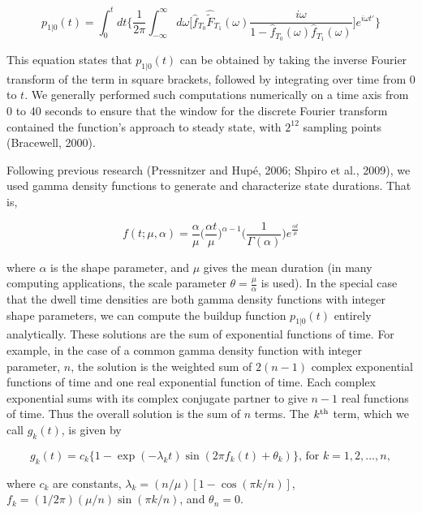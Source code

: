 \begin{equation}
p_{1|0}(t)=\int_{0}^{t}dt\bigg\{\frac{1}{2\pi}\int_{-\infty}^{\infty}d\omega\Bigg[\hat{f}_{T_0}\hat{\tilde{F}}_{T_1}(\omega)\frac{i\omega}{1-\hat{f}_{T_0}(\omega)\hat{f}_{T_1}(\omega)}\Bigg]e^{i\omega t'}\bigg\}
\label{eqn:p10tInt}
\end{equation}

This equation states that $p_{1|0}(t)$ can be obtained by taking the inverse Fourier transform of the term in square brackets, followed by integrating over time from 0 to $t$. We generally performed such computations numerically on a time axis from 0 to 40 seconds to ensure that the window for the discrete Fourier transform contained the function's approach to steady state, with $2^{12}$ sampling points (Bracewell, 2000). 

Following previous research (Pressnitzer and Hupé, 2006; Shpiro et al., 2009), we used gamma density functions to generate and characterize state durations. That is, 

\begin{equation}
f(t; \mu,\alpha) = \frac{\alpha}{\mu}\bigg(\frac{\alpha t}{\mu}\bigg)^{\alpha-1}\bigg(\frac{1}{\Gamma(\alpha)}\bigg)e^{\frac{\alpha t}{\mu}}
\label{gamma}
\end{equation}

where $\alpha$ is the shape parameter, and $\mu$ gives the mean duration (in many computing applications, the scale parameter $\theta=\frac{\mu}{\alpha}$ is used). In the special case that the dwell time densities are both gamma density functions with integer shape parameters, we can compute the buildup function $p_{1|0}(t)$ entirely analytically. These solutions are the sum of exponential functions of time. For example, in the case of a common gamma density function with integer parameter, $n$, the solution is the weighted sum of $2(n-1)$ complex exponential functions of time and one real exponential function of time. Each complex exponential sums with its complex conjugate partner to give $n-1$ real functions of time. Thus the overall solution is the sum of $n$ terms. The $k\textsuperscript{th}$ term, which we call $g_k(t)$, is given by 

\begin{equation}
g_k(t)=c_k\{1-\exp(-\lambda_kt)\sin(2\pi f_k(t)+\theta_k)\} \text{, for }k=1,2,...,n,
\label{gk}
\end{equation}

where $c_k$ are constants, $\lambda_k=(n/\mu)[1-\cos(\pi k/n)]$,$f_k=(1/2\pi)(\mu/n)\sin(\pi k/n)$, and $\theta_n=0$. 

